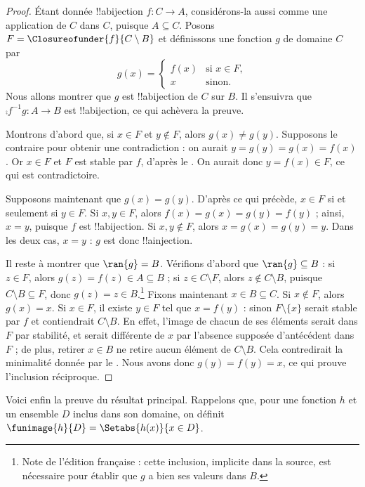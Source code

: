\documentclass[11pt,a4paper,openany]{memoir}
\begin{document}
\begin{proof}
Étant donnée !!a{bijection} $f\colon C\to A$, considérons-la aussi
comme une application de $C$ dans $C$, puisque $A\subseteq C$.
Posons $F=\Closureofunder{f}{C\setminus B}$ et définissons une
fonction $g$ de domaine $C$ par
\[
	g(x) =
	\begin{cases}
			f(x) &\text{si $x \in F$},\\
			x &\text{sinon}.
		\end{cases}
\]
Nous allons montrer que $g$ est !!a{bijection} de $C$ sur $B$.
Il s'ensuivra que $\comp{f^{-1}}{g}\colon A\to B$ est
!!a{bijection}, ce qui achèvera la preuve.

Montrons d'abord que, si $x\in F$ et $y\notin F$, alors
$g(x)\neq g(y)$. Supposons le contraire pour obtenir une contradiction :
on aurait $y=g(y)=g(x)=f(x)$. Or $x\in F$ et $F$ est stable par $f$,
d'après le . On aurait donc $y=f(x)\in F$,
ce qui est contradictoire.

Supposons maintenant que $g(x)=g(y)$. D'après ce qui précède,
$x\in F$ si et seulement si $y\in F$. Si $x,y\in F$, alors
$f(x)=g(x)=g(y)=f(y)$ ; ainsi, $x=y$, puisque $f$ est !!a{bijection}.
Si $x,y\notin F$, alors $x=g(x)=g(y)=y$. Dans les deux cas, $x=y$ :
$g$ est donc !!a{injection}.

Il reste à montrer que $\ran{g}=B$. Vérifions d'abord que
$\ran{g}\subseteq B$ : si $z\in F$, alors $g(z)=f(z)\in A\subseteq B$ ;
si $z\in C\setminus F$, alors $z\notin C\setminus B$, puisque
$C\setminus B\subseteq F$, donc $g(z)=z\in B$.\footnote{Note de
l'édition française : cette inclusion, implicite dans la source, est
nécessaire pour établir que $g$ a bien ses valeurs dans $B$.}
Fixons maintenant $x\in B\subseteq C$. Si $x\notin F$, alors $g(x)=x$.
Si $x\in F$, il existe $y\in F$ tel que $x=f(y)$ : sinon
$F\setminus\{x\}$ serait stable par $f$ et contiendrait $C\setminus B$.
En effet, l'image de chacun de ses éléments serait dans $F$ par stabilité,
et serait différente de $x$ par l'absence supposée d'antécédent dans $F$ ;
de plus, retirer $x\in B$ ne retire aucun élément de $C\setminus B$.
Cela contredirait la minimalité donnée par le .
Nous avons donc $g(y)=f(y)=x$, ce qui prouve l'inclusion réciproque.
\end{proof}

Voici enfin la preuve du résultat principal. Rappelons que, pour une
fonction $h$ et un ensemble $D$ inclus dans son domaine, on définit
$\funimage{h}{D}=\Setabs{h(x)}{x\in D}$.
\end{document}
